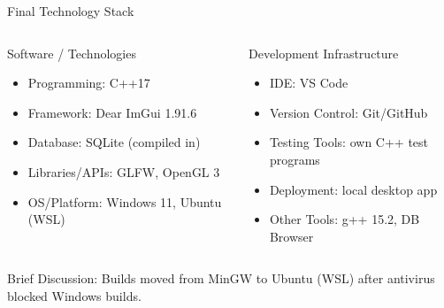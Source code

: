 \documentclass[aspectratio=169,11pt]{beamer}
\newcommand{\smallnote}[1]{%
\vspace{0.08cm}
{\scriptsize\color{GEUGrey}#1}
}
\begin{document}
\begin{frame}{Final Technology Stack}

\begin{columns}[T,totalwidth=\textwidth]


\begin{block}{Software / Technologies}
\begin{itemize}\itemsep2pt
    \item Programming: C++17
    \item Framework: Dear ImGui 1.91.6
    \item Database: SQLite (compiled in)
    \item Libraries/APIs: GLFW, OpenGL 3
    \item OS/Platform: Windows 11, Ubuntu (WSL)
\end{itemize}
\end{block}


\begin{block}{Development Infrastructure}
\begin{itemize}\itemsep2pt
    \item IDE: VS Code
    \item Version Control: Git/GitHub
    \item Testing Tools: own C++ test programs
    \item Deployment: local desktop app
    \item Other Tools: g++ 15.2, DB Browser
\end{itemize}
\end{block}

\end{columns}

\vfill

\smallnote{
Brief Discussion: Builds moved from MinGW to Ubuntu (WSL) after antivirus blocked Windows builds.
}

\end{frame}
\end{document}
